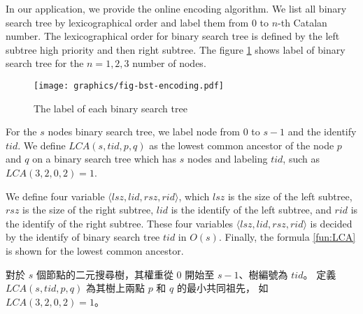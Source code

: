 In our application, we provide the online encoding algorithm.  We list
all binary search tree by lexicographical order and label them from
$0$ to $n$-th Catalan number.  The lexicographical order for binary
search tree is defined by the left subtree high priority and then
right subtree.  The figure \ref{fig:labelingBST} shows label of binary
search tree for the $n=1,2,3$ number of nodes.

\iffalse
關於在線操作，我們從 Fischer \cite{fischer} 和 Masud \cite{masud} 的研究中，
分別得到關於笛卡爾的編碼與快取改善的技術，而這些技術都著手於離線操作，
即一開始給訂 $n$ 個元素值，並且在 $O(n)$ 時間內編碼一棵樹；
接著，再利用前處理的查找表完成極值查找。

關於快取效能，因詢問次數與元素個數相當，
故無法像 Masud \cite{masud} 的研究藉由排序編碼以減少快取未中的問題，
只能依賴數據本身的分佈和編碼之間的關聯來減少快取未中的情況。

從上述幾點觀點出發，我們提出動態的編碼方式。
算法採用字典順序的方式編碼一棵樹，優先增長左子樹，
當相同左子樹時，增長右子樹的方式進行編號，其編碼方式如圖 \ref{fig:lablingBST}。
\fi

\begin{figure}[!thb]
  \centering
  \texttt{[image: graphics/fig-bst-encoding.pdf]}
  \caption{The label of each binary search tree}
  \label{fig:labelingBST}
\end{figure}

For the $s$ nodes binary search tree, we label node from $0$ to $s-1$
and the identify $\mathit{tid}$.  We define $\mathit{LCA}(s,
\mathit{tid}, p, q)$ as the lowest common ancestor of the node $p$ and
$q$ on a binary search tree which has $s$ nodes and labeling
$\mathit{tid}$, such as $\mathit{LCA}(3, 2, 0, 2) = 1$.

We define four variable
$\langle\mathit{lsz},\mathit{lid},\mathit{rsz},\mathit{rid}\rangle$,
which $\mathit{lsz}$ is the size of the left subtree, $\mathit{rsz}$
is the size of the right subtree, $\mathit{lid}$ is the identify of
the left subtree, and $\mathit{rid}$ is the identify of the right
subtree.  These four variables
$\langle\mathit{lsz},\mathit{lid},\mathit{rsz},\mathit{rid}\rangle$ is
decided by the identify of binary search tree $\mathit{tid}$ in
$O(s)$.  Finally, the formula \ref{fun:LCA} is shown for the lowest
common ancestor.

\iffalse
對於 $s$ 個節點的二元搜尋樹，其權重從 $0$ 開始至 $s-1$、樹編號為 $\mathit{tid}$。
定義 $\mathit{LCA}(s, \mathit{tid}, p, q)$ 為其樹上兩點 $p$ 和 $q$ 的最小共同祖先，
如 $\mathit{LCA}(3, 2, 0, 2) = 1$。

